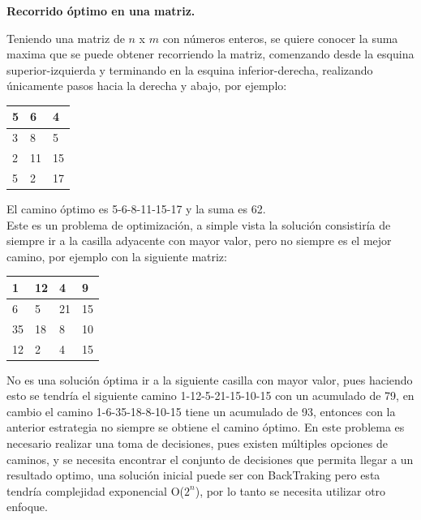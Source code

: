\documentclass[12pt, a4paper]{article}
\newcommand{\subtitulo}[1]{\begin{center}\textbf{#1}\end{center}}
\begin{document}
	\subtitulo{Recorrido óptimo en una matriz.}
	
	Teniendo una matriz de $n$ x $m$ con números enteros, se quiere conocer la suma maxima que se puede obtener
	recorriendo la matriz, comenzando desde la esquina superior-izquierda y terminando en la esquina inferior-derecha,
	realizando únicamente pasos hacia la derecha y abajo, por ejemplo:\\
	\begin{center}
		\begin{tabular}{|l|l|l|}
			\hline
			5  &6 &4 \\ \hline
			3  &8  &5 \\ \hline
			2 &11 &15 \\ \hline
			5 &2  &17 \\ \hline
		\end{tabular}
	\end{center}
	El camino óptimo es 5-6-8-11-15-17 y la suma es 62.\\
	
	Este es un problema de optimización, a simple vista la solución consistiría de siempre ir a la casilla adyacente
	con mayor valor, pero no siempre es el mejor camino, por ejemplo con la siguiente matriz:
	\begin{center}
		\begin{tabular}{|l|l|l|l|}
		 	\hline
			1  & 12 & 4  & 9 \\ \hline
			6  & 5  & 21 & 15 \\ \hline
			35 & 18 & 8  & 10 \\ \hline
			12 & 2  & 4  & 15 \\ \hline
		\end{tabular}
	\end{center}
	No es una solución óptima ir a la siguiente casilla con mayor valor, pues haciendo esto se tendría el siguiente
	camino 1-12-5-21-15-10-15 con un acumulado de 79, en cambio el camino 1-6-35-18-8-10-15 tiene un acumulado de 93,
	entonces con la anterior estrategia no siempre se obtiene el camino óptimo. En este problema es necesario realizar
	una toma de decisiones, pues existen múltiples opciones de caminos, y se necesita encontrar el conjunto de
	decisiones que permita llegar a un resultado optimo, una solución inicial puede ser con BackTraking pero esta 
	tendría complejidad exponencial O($2^{n}$), por lo tanto se necesita utilizar otro enfoque.\\
	
\end{document}
